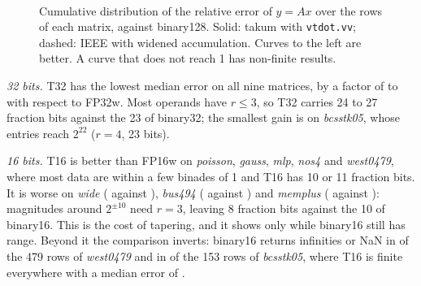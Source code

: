 \documentclass[conference]{IEEEtran}
\newcommand{\code}[1]{\texttt{#1}}
\newcommand{\res}{../../results}
\newcommand{\cdf}[3][]{\addplot+[no markers, #1] table[x=err, y=frac] {\res/cdf_#2_#3.dat};}
\newcommand{\matplot}[2][]{%
  \nextgroupplot[title={#2}, #1]
  \cdf[blue!75!black]{#2}{T8}    \cdf[blue!75!black, dashed]{#2}{FP8w}
  \cdf[red!75!black]{#2}{T16}    \cdf[red!75!black, dashed]{#2}{FP16w}
  \cdf[green!45!black]{#2}{T32}  \cdf[green!45!black, dashed]{#2}{FP32w}}
\begin{document}
\begin{figure}[t]
\centering
{}\\[1.5mm]
\caption{Cumulative distribution of the relative error of $y=Ax$ over the rows of each matrix, against
binary128. Solid: takum with \code{vtdot.vv}; dashed: IEEE with widened accumulation. Curves to the left
are better. A curve that does not reach 1 has non-finite results.}
\label{fig:cdf}
\end{figure}

\emph{32 bits.} T32 has the lowest median error on all nine matrices, by a factor of \RATA{} to
\RATB{} with respect to FP32w. Most operands have $r\le3$, so T32 carries 24 to 27 fraction bits against
the 23 of binary32; the smallest gain is on \emph{bcsstk05}, whose entries reach $2^{22}$ ($r=4$, 23
bits).

\emph{16 bits.} T16 is better than FP16w on \emph{poisson}, \emph{gauss}, \emph{mlp}, \emph{nos4} and
\emph{west0479}, where most data are within a few binades of 1 and T16 has 10 or 11 fraction bits. It is
worse on \emph{wide} (\WIDET{} against \WIDEF{}), \emph{bus494} (\BUST{} against \BUSF{}) and
\emph{memplus} (\MEMTS{} against \MEMFS{}): magnitudes around $2^{\pm10}$ need $r=3$, leaving 8
fraction bits against the 10 of binary16. This is the
cost of tapering, and it shows only while binary16 still has range. Beyond it the comparison inverts:
binary16 returns infinities or NaN in \NFWESTH{} of the 479 rows of \emph{west0479} and in \NFBCSH{} of
the 153 rows of \emph{bcsstk05}, where T16 is finite everywhere with a median error of \BCSTSIXTEEN.
\end{document}
